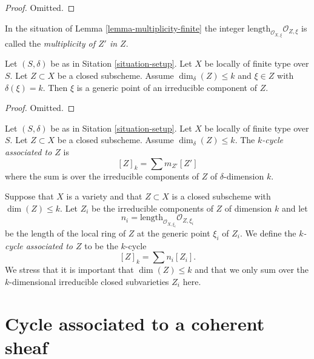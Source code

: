 \begin{proof}
Omitted.
\end{proof}

\begin{definition}
\label{definition-multiplicity}
In the situation of Lemma \ref{lemma-multiplicity-finite} the
integer $\text{length}_{\mathcal{O}_{X, \xi}} \mathcal{O}_{Z, \xi}$
is called the {\it multiplicity of $Z'$ in $Z$}.
\end{definition}

\begin{lemma}
\label{lemma-top-dimension-generic}
Let $(S, \delta)$ be as in Sitation \ref{situation-setup}.
Let $X$ be locally of finite type over $S$.
Let $Z \subset X$ be a closed subscheme.
Assume $\dim_\delta(Z) \leq k$ and $\xi \in Z$ with
$\delta(\xi) = k$. Then $\xi$ is a generic point of
an irreducible component of $Z$.
\end{lemma}

\begin{proof}
Omitted.
\end{proof}

\begin{definition}
\label{definition-cycle-associated-to}
Let $(S, \delta)$ be as in Sitation \ref{situation-setup}.
Let $X$ be locally of finite type over $S$.
Let $Z \subset X$ be a closed subscheme.
Assume $\dim_\delta(Z) \leq k$.
The {\it $k$-cycle associated to $Z$} is
$$
[Z]_k
=
\sum m_{Z'}[Z']
$$
where the sum is over the irreducible components of $Z$
of $\delta$-dimension $k$.
\end{definition}



Suppose that $X$ is a variety and that $Z \subset X$ is a closed
subscheme with $\dim(Z) \leq k$. Let $Z_i$ be the irreducible
components of $Z$ of dimension $k$ and let
$$
n_i = \text{length}_{\mathcal{O}_{X, \xi_i}} \mathcal{O}_{Z, \xi_i}
$$
be the length of the local ring of $Z$ at the generic point
$\xi_i$ of $Z_i$.
We define the {\it $k$-cycle associated to $Z$} to be the $k$-cycle
$$
[Z]_k = \sum n_i [Z_i].
$$
We stress that it is important that $\dim(Z) \leq k$ and that we
only sum over the $k$-dimensional irreducible closed subvarieties
$Z_i$ here.

\section{Cycle associated to a coherent sheaf}
\label{section-cycle-of-coherent-sheaf}

